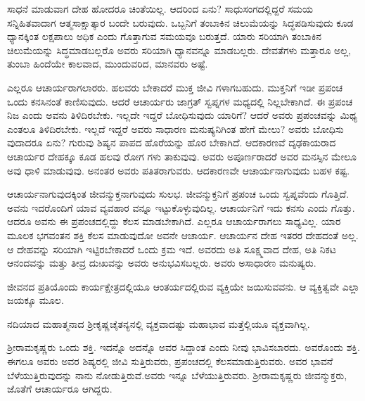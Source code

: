 ಸಾಧನೆ ಮಾಡುವಾಗ ದೇಹ ಹೋದರೂ ಚಿಂತೆಯಿಲ್ಲ. ಆದರಿಂದ ಏನು? ಸಾಧುಸಂಗದಲ್ಲಿದ್ದರೆ ಸಮಯ ಸನ್ನಿಹಿತವಾದಾಗ ಆತ್ಮಸಾಕ್ಷಾತ್ಕಾರ ಬಂದೇ ಬರುವುದು. ಒಬ್ಬನಿಗೆ ತಂಬಾಕಿನ ಚಿಲುಮೆಯನ್ನು ಸಿದ್ಧಪಡಿಸುವುದು ಕೂಡ ಧ್ಯಾನಕ್ಕಿಂತ ಲಕ್ಷಪಾಲು ಅಧಿಕ ಎಂದು ಗೊತ್ತಾಗುವ ಸಮಯವೂ ಬರುತ್ತದೆ. ಯಾರು ಸರಿಯಾಗಿ ತಂಬಾಕಿನ ಚಿಲುಮೆಯನ್ನು ಸಿದ್ಧಮಾಡಬಲ್ಲರೊ ಅವರು ಸರಿಯಾಗಿ ಧ್ಯಾನವನ್ನೂ ಮಾಡಬಲ್ಲರು. ದೇವತೆಗಳು ಮತ್ತಾರೂ ಅಲ್ಲ, ತುಂಬಾ ಹಿಂದೆಯೇ ಕಾಲವಾದ, ಮುಂದುವರಿದ, ಮಾನವರು ಅಷ್ಟೆ.

ಎಲ್ಲರೂ ಆಚಾರ್ಯರಾಗಲಾರರು. ಹಲವರು ಬೇಕಾದರೆ ಮುಕ್ತ ಜೀವಿ ಗಳಾಗಬಹುದು. ಮುಕ್ತನಿಗೆ ಇಡೀ ಪ್ರಪಂಚ ಒಂದು ಕನಸಿನಂತೆ ಕಾಣಿಸುವುದು. ಆದರೆ ಆಚಾರ್ಯರು ಜಾಗ್ರತ್​ ಸ್ವಪ್ನಗಳ ಮಧ್ಯದಲ್ಲಿ ನಿಲ್ಲಬೇಕಾಗಿದೆ. ಈ ಪ್ರಪಂಚ ನಿಜ ಎಂದು ಅವನು ತಿಳಿದಿರಬೇಕು. ಇಲ್ಲದೇ ಇದ್ದರೆ ಬೋಧಿಸುವುದು ಯಾರಿಗೆ? ಆದರೆ ಅವರು ಪ್ರಪಂಚವನ್ನು ಮಿಥ್ಯ ಎಂತಲೂ ತಿಳಿದಿರಬೇಕು. ಇಲ್ಲದೆ ಇದ್ದರೆ ಅವರು ಸಾಧಾರಣ ಮನುಷ್ಯನಿಗಿಂತ ಹೇಗೆ ಮೇಲು? ಅವರು ಬೋಧಿಸು ವುದಾದರೂ ಏನು? ಗುರುವು ಶಿಷ್ಯನ ಪಾಪದ ಹೊರೆಯನ್ನು ಹೊರ ಬೇಕಾಗಿದೆ. ಆದಕಾರಣವೆ ದೃಢಕಾಯರಾದ ಆಚಾರ್ಯರ ದೇಹಕ್ಕೂ ಕೂಡ ಹಲವು ರೋಗ ಗಳು ತಾಕುವುವು. ಅವರು ಅಪೂರ್ಣರಾದರೆ ಅವರ ಮನಸ್ಸಿನ ಮೇಲೂ ಅವು ಧಾಳಿ ಮಾಡುವುವು. ಅನಂತರ ಅವರು ಪತಿತರಾಗುವರು. ಆದಕಾರಣವೇ ಆಚಾರ್ಯನಾಗುವುದು ಬಹಳ ಕಷ್ಟ.

ಆಚಾರ್ಯನಾಗುವುದಕ್ಕಿಂತ ಜೀವನ್ಮುಕ್ತನಾಗುವುದು ಸುಲಭ. ಜೀವನ್ಮುಕ್ತನಿಗೆ ಪ್ರಪಂಚ ಒಂದು ಸ್ವಪ್ನವೆಂದು ಗೊತ್ತಿದೆ. ಅವನು ಇದರೊಂದಿಗೆ ಯಾವ ವ್ಯವಹಾರ ವನ್ನೂ ಇಟ್ಟುಕೊಳ್ಳುವುದಿಲ್ಲ. ಆಚಾರ್ಯನಿಗೆ ಇದು ಕನಸು ಎಂದು ಗೊತ್ತು. ಆದರೂ ಅವನು ಈ ಪ್ರಪಂಚದಲ್ಲಿದ್ದು ಕೆಲಸ ಮಾಡಬೇಕಾಗಿದೆ. ಎಲ್ಲರೂ ಆಚಾರ್ಯರಾಗಲು ಸಾಧ್ಯವಿಲ್ಲ. ಯಾರ ಮೂಲಕ ಭಗವಂತನ ಶಕ್ತಿ ಕೆಲಸ ಮಾಡುವುದೋ ಅವನೇ ಆಚಾರ್ಯ. ಆಚಾರ್ಯನ ದೇಹ ಇತರರ ದೇಹದಂತೆ ಅಲ್ಲ. ಆ ದೇಹವನ್ನು ಸರಿಯಾಗಿ ಇಟ್ಟಿರಬೇಕಾದರೆ ಒಂದು ಕ್ರಮ ಇದೆ. ಅವರದು ಅತಿ ಸೂಕ್ಷ್ಮವಾದ ದೇಹ, ಅತಿ ನಿಕಟ ಆನಂದವನ್ನು ಮತ್ತು ತೀವ್ರ ದುಃಖವನ್ನು ಅವರು ಅನುಭವಿಸಬಲ್ಲರು. ಅವರು ಅಸಾಧಾರಣ ಮನುಷ್ಯರು.

ಜೀವನದ ಪ್ರತಿಯೊಂದು ಕಾರ್ಯಕ್ಷೇತ್ರದಲ್ಲಿಯೂ ಆಂತರ್ಯದಲ್ಲಿರುವ ವ್ಯಕ್ತಿಯೇ ಜಯಿಸುವವನು. ಆ ವ್ಯಕ್ತಿತ್ವವೇ ಎಲ್ಲಾ ಜಯಕ್ಕೂ ಮೂಲ.

ನದಿಯಾದ ಮಹಾತ್ಮನಾದ ಶ‍್ರೀಕೃಷ್ಣಚೈತನ್ಯನಲ್ಲಿ ವ್ಯಕ್ತವಾದಷ್ಟು ಮಹಾಭಾವ ಮತ್ತೆಲ್ಲಿಯೂ ವ್ಯಕ್ತವಾಗಿಲ್ಲ.

ಶ‍್ರೀರಾಮಕೃಷ್ಣರು ಒಂದು ಶಕ್ತಿ. ಇದನ್ನೊ ಅದನ್ನೊ ಅವರ ಸಿದ್ದಾಂತ ಎಂದು ನೀವು ಭಾವಿಸಬಾರದು. ಅವರೊಂದು ಶಕ್ತಿ. ಈಗಲೂ ಅವರು ಅವರ ಶಿಷ್ಯರಲ್ಲಿ ಜೀವಿ ಸುತ್ತಿರುವರು, ಪ್ರಪಂಚದಲ್ಲಿ ಕೆಲಸಮಾಡುತ್ತಿರುವರು. ಅವರ ಭಾವನೆ ಬೆಳೆಯುತ್ತಿರುವುದನ್ನು ನಾನು ನೋಡುತ್ತಿರುವೆ.ಅವರು ಇನ್ನೂ ಬೆಳೆಯುತ್ತಿರುವರು. ಶ‍್ರೀರಾಮಕೃಷ್ಣರು ಜೀವನ್ಮುಕ್ತರು, ಜೊತೆಗೆ ಆಚಾರ್ಯರೂ ಆಗಿದ್ದರು.

